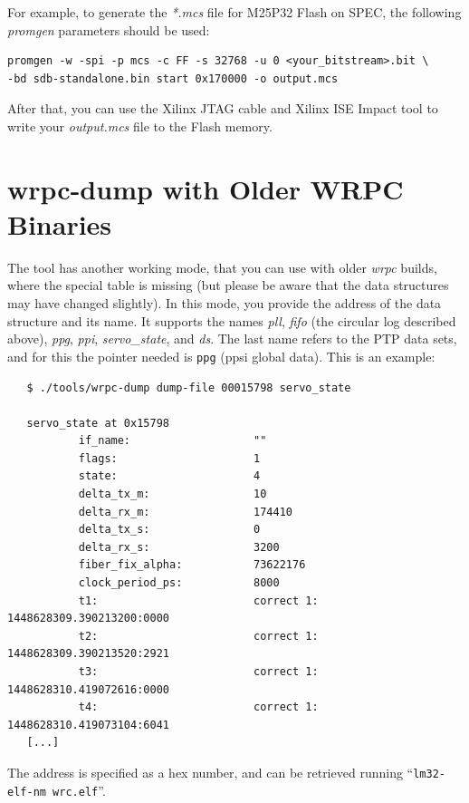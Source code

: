 \documentclass[a4paper, 12pt]{article}
\newcommand{\codeHook}[1]{\mbox{\ttfamily\MakeTextUppercase{#1}}}
\begin{document}
For example, to generate the \textit{*.mcs} file for M25P32 Flash on \codeHook{spec}, the
following \textit{promgen} parameters should be used:
\begin{lstlisting}
promgen -w -spi -p mcs -c FF -s 32768 -u 0 <your_bitstream>.bit \
-bd sdb-standalone.bin start 0x170000 -o output.mcs
\end{lstlisting}

After that, you can use the Xilinx JTAG cable and Xilinx ISE Impact tool to
write your \textit{output.mcs} file to the Flash memory.
\newpage
\section{wrpc-dump with Older WRPC Binaries}
\label{wrpc-dump with Older WRPC Binaries}

The tool has another working mode, that you can use with older
\textit{wrpc} builds, where the special table is missing (but please be
aware that the data structures may have changed slightly).  In this
mode, you provide the address of the data structure and its name. It
supports the names \textit{pll}, \textit{fifo} (the circular log described
above), \textit{ppg}, \textit{ppi}, \textit{servo\_state}, and \textit{ds}. The last name
refers to the PTP data sets, and for this the pointer needed is
\texttt{ppg} (ppsi global data).
This is an example:

\begin{lstlisting}
   $ ./tools/wrpc-dump dump-file 00015798 servo_state

   servo_state at 0x15798
           if_name:                   ""
           flags:                     1
           state:                     4
           delta_tx_m:                10
           delta_rx_m:                174410
           delta_tx_s:                0
           delta_rx_s:                3200
           fiber_fix_alpha:           73622176
           clock_period_ps:           8000
           t1:                        correct 1: 1448628309.390213200:0000
           t2:                        correct 1: 1448628309.390213520:2921
           t3:                        correct 1: 1448628310.419072616:0000
           t4:                        correct 1: 1448628310.419073104:6041
   [...]
\end{lstlisting}

The address is specified as a hex number, and can be retrieved running
``\texttt{lm32-elf-nm  wrc.elf}''.
\end{document}
